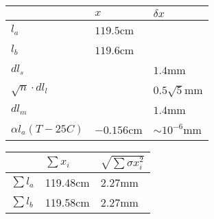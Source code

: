 \begin{tabular}{| l | l | l |}
\hline
 & $x$ & $\delta x$ \\
\hline
$l_a$                 & $119.5$cm &    \\             
$l_b$                 & $119.6$cm &    \\        
$dl_s$                &     & $1.4$mm   \\             
$\sqrt{n}\cdot dl_l$  &     & $0.5\sqrt{5}$mm   \\                  
$dl_m$                &     & $1.4$mm   \\                  
$\alpha l_a (T-25C)$  & $-0.156$cm & $\sim 10^{-6}$mm   \\ 
\hline                

\end{tabular}

\begin{tabular}{| l | l | l |}
\hline
& $\sum x_i$ & $\sqrt {\sum \sigma x_i^2 }$ \\
\hline
$\sum l_a$ & 119.48cm & 2.27mm \\
$\sum l_b$ & 119.58cm & 2.27mm \\
\hline   
\end{tabular}